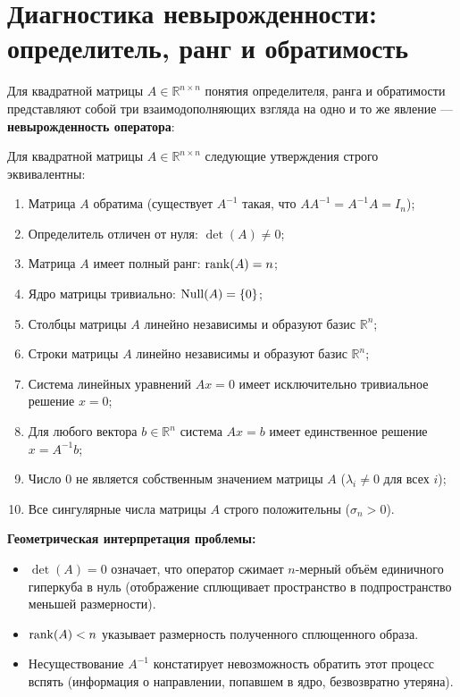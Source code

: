 \section{Диагностика невырожденности: определитель, ранг и обратимость}

Для квадратной матрицы $A\in\mathbb{R}^{n\times n}$ понятия определителя, ранга и обратимости представляют собой три
взаимодополняющих взгляда на одно и то же явление — \textbf{невырожденность оператора}:

\begin{theorem}
Для квадратной матрицы $A \in \mathbb{R}^{n \times n}$ следующие утверждения строго эквивалентны:
\begin{enumerate}
    \item Матрица $A$ обратима (существует $A^{-1}$ такая, что $A A^{-1} = A^{-1} A = I_n$);
    \item Определитель отличен от нуля: $\det(A) \ne 0$;
    \item Матрица $A$ имеет полный ранг: $\operatorname{rank}(A) = n$;
    \item Ядро матрицы тривиально: $\operatorname{Null}(A) = \{0\}$;
    \item Столбцы матрицы $A$ линейно независимы и образуют базис $\mathbb{R}^n$;
    \item Строки матрицы $A$ линейно независимы и образуют базис $\mathbb{R}^n$;
    \item Система линейных уравнений $Ax = 0$ имеет исключительно тривиальное решение $x = 0$;
    \item Для любого вектора $b \in \mathbb{R}^n$ система $Ax = b$ имеет единственное решение $x = A^{-1} b$;
    \item Число 0 не является собственным значением матрицы $A$ ($\lambda_i \ne 0$ для всех $i$);
    \item Все сингулярные числа матрицы $A$ строго положительны ($\sigma_n > 0$).
\end{enumerate}
\end{theorem}

\textbf{Геометрическая интерпретация проблемы:}
\begin{itemize}
    \item $\det(A) = 0$ означает, что оператор сжимает $n$-мерный объём единичного гиперкуба в нуль
    (отображение сплющивает пространство в подпространство меньшей размерности).
    \item $\operatorname{rank}(A) < n$ указывает размерность полученного сплющенного образа.
    \item Несуществование $A^{-1}$ констатирует невозможность обратить этот процесс вспять
    (информация о направлении, попавшем в ядро, безвозвратно утеряна).
\end{itemize}

